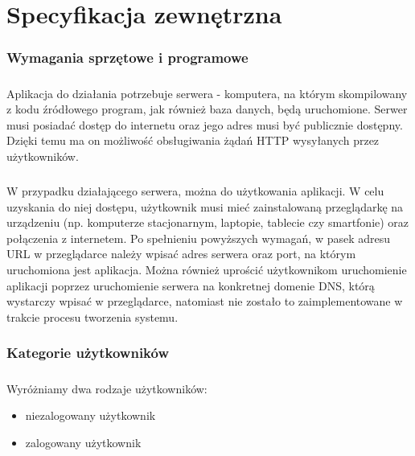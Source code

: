 \chapter{Specyfikacja zewnętrzna}
\label{ch:04}

\subsection{Wymagania sprzętowe i programowe}
\paragraph{}
Aplikacja do działania potrzebuje serwera - komputera, na którym skompilowany z kodu źródłowego program, jak również baza danych, będą uruchomione. Serwer musi posiadać dostęp do internetu oraz jego adres musi być publicznie dostępny. Dzięki temu ma on możliwość obsługiwania żądań HTTP wysyłanych przez użytkowników.

\paragraph{}
W przypadku działającego serwera, można do użytkowania aplikacji. W celu uzyskania do niej dostępu, użytkownik musi mieć zainstalowaną przeglądarkę na urządzeniu (np. komputerze stacjonarnym, laptopie, tablecie czy smartfonie) oraz połączenia z internetem. Po spełnieniu powyższych wymagań, w pasek adresu URL w przeglądarce należy wpisać adres serwera oraz port, na którym uruchomiona jest aplikacja. Można również uprościć użytkownikom uruchomienie aplikacji poprzez uruchomienie serwera na konkretnej domenie DNS, którą wystarczy wpisać w przeglądarce, natomiast nie zostało to zaimplementowane w trakcie procesu tworzenia systemu.

\subsection{Kategorie użytkowników}
\paragraph{}
Wyróżniamy dwa rodzaje użytkowników: 
\begin{itemize}
	\item niezalogowany użytkownik
	\item zalogowany użytkownik
\end{itemize}

